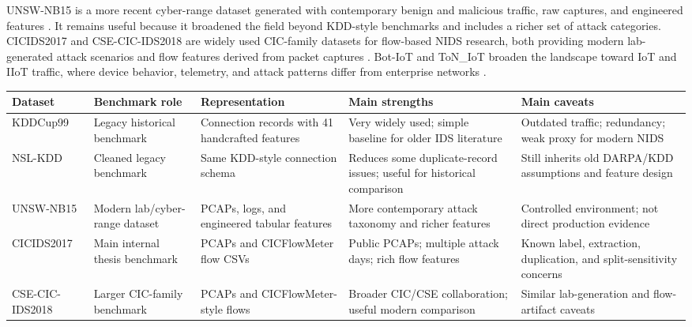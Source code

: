 UNSW-NB15 is a more recent cyber-range dataset generated with contemporary benign and malicious traffic, raw captures, and engineered features \parencite{MoustafaSlay2015UNSWNB15,Moustafa2016UNSWEval}. It remains useful because it broadened the field beyond KDD-style benchmarks and includes a richer set of attack categories. CICIDS2017 and CSE-CIC-IDS2018 are widely used CIC-family datasets for flow-based NIDS research, both providing modern lab-generated attack scenarios and flow features derived from packet captures \parencite{Sharafaldin2018CICIDS2017,CSECICIDS2018AWS}. Bot-IoT and ToN\_IoT broaden the landscape toward IoT and IIoT traffic, where device behavior, telemetry, and attack patterns differ from enterprise networks \parencite{Koroniotis2019BotIoT,Moustafa2020ToNIoT,Alsaedi2020ToNIoT}.

\begin{table}[htbp]
\centering
\scriptsize
\setlength{\tabcolsep}{3pt}
\begin{tabular}{p{1.85cm}p{1.9cm}p{2.45cm}p{2.65cm}p{2.8cm}}
\toprule
Dataset & Benchmark role & Representation & Main strengths & Main caveats \\
\midrule
KDDCup99 & Legacy historical benchmark & Connection records with 41 handcrafted features & Very widely used; simple baseline for older IDS literature \parencite{KDDCup1999} & Outdated traffic; redundancy; weak proxy for modern NIDS \parencite{Ring2019DatasetSurvey} \\
NSL-KDD & Cleaned legacy benchmark & Same KDD-style connection schema & Reduces some duplicate-record issues; useful for historical comparison \parencite{Tavallaee2009NSLKDD} & Still inherits old DARPA/KDD assumptions and feature design \\
UNSW-NB15 & Modern lab/cyber-range dataset & PCAPs, logs, and engineered tabular features & More contemporary attack taxonomy and richer features \parencite{MoustafaSlay2015UNSWNB15} & Controlled environment; not direct production evidence \\
CICIDS2017 & Main internal thesis benchmark & PCAPs and CICFlowMeter flow CSVs & Public PCAPs; multiple attack days; rich flow features \parencite{Sharafaldin2018CICIDS2017} & Known label, extraction, duplication, and split-sensitivity concerns \parencite{Engelen2021CICIDSIssues,Lanvin2023Errors} \\
CSE-CIC-IDS2018 & Larger CIC-family benchmark & PCAPs and CICFlowMeter-style flows & Broader CIC/CSE collaboration; useful modern comparison \parencite{CSECICIDS2018AWS} & Similar lab-generation and flow-artifact caveats \parencite{Liu2022ErrorPrevalenceNIDS} \\

\end{tabular}
\end{table}
